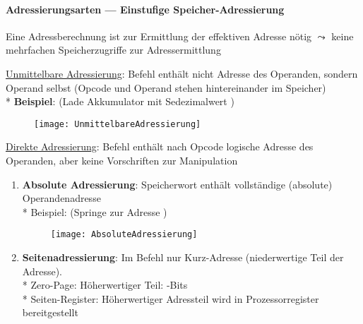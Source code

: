 \paragraph{Adressierungsarten --- Einstufige Speicher-Adressierung}
\begin{items}
	\item Eine Adressberechnung ist zur Ermittlung der effektiven Adresse nötig $\leadsto$ keine mehrfachen Speicherzugriffe zur Adressermittlung
	\item \underline{Unmittelbare Adressierung}: Befehl enthält nicht Adresse des Operanden, sondern Operand selbst (Opcode und Operand stehen hintereinander im Speicher) \\* \textbf{Beispiel}:  (Lade Akkumulator mit Sedezimalwert )
		\begin{figure}[H]
		  \centering
		  \texttt{[image: UnmittelbareAdressierung]}
		  \label{UnmittelbareAdressierung}
		\end{figure}
	\item \underline{Direkte Adressierung}: Befehl enthält nach Opcode logische Adresse des Operanden, aber keine Vorschriften zur Manipulation
	\begin{enumerate}
		\item \textbf{Absolute Adressierung}: Speicherwort enthält vollständige (absolute) Operandenadresse \\* Beispiel:  (Springe zur Adresse )
		\begin{figure}[H]
		  \centering
		  \texttt{[image: AbsoluteAdressierung]}
		  \label{AbsoluteAdressierung}
		\end{figure}
		\item \textbf{Seitenadressierung}: Im Befehl nur Kurz-Adresse (niederwertige Teil der Adresse). \\* Zero-Page: Höherwertiger Teil: -Bits \\* Seiten-Register: Höherwertiger Adressteil wird in Prozessorregister bereitgestellt
	\end{enumerate}


\end{items}
